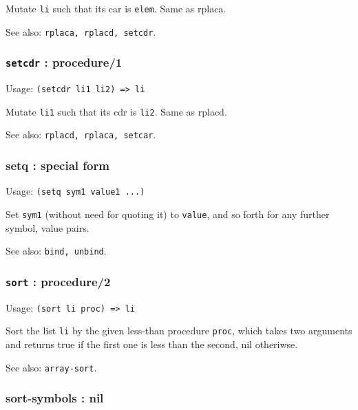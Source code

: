 \documentclass[
]{article}
\newcommand{\passthrough}[1]{#1}
\begin{document}
Mutate \passthrough{\lstinline!li!} such that its car is
\passthrough{\lstinline!elem!}. Same as rplaca.

See also: \passthrough{\lstinline!rplaca, rplacd, setcdr!}.

\hypertarget{setcdr-procedure1}{%
\subsubsection{\texorpdfstring{\texttt{setcdr} :
procedure/1}{setcdr : procedure/1}}\label{setcdr-procedure1}}

Usage: \passthrough{\lstinline!(setcdr li1 li2) => li!}

Mutate \passthrough{\lstinline!li1!} such that its cdr is
\passthrough{\lstinline!li2!}. Same as rplacd.

See also: \passthrough{\lstinline!rplacd, rplaca, setcar!}.

\hypertarget{setq-special-form}{%
\subsubsection{setq : special form}\label{setq-special-form}}

Usage: \passthrough{\lstinline!(setq sym1 value1 ...)!}

Set \passthrough{\lstinline!sym1!} (without need for quoting it) to
\passthrough{\lstinline!value!}, and so forth for any further symbol,
value pairs.

See also: \passthrough{\lstinline!bind, unbind!}.

\hypertarget{sort-procedure2}{%
\subsubsection{\texorpdfstring{\texttt{sort} :
procedure/2}{sort : procedure/2}}\label{sort-procedure2}}

Usage: \passthrough{\lstinline!(sort li proc) => li!}

Sort the list \passthrough{\lstinline!li!} by the given less-than
procedure \passthrough{\lstinline!proc!}, which takes two arguments and
returns true if the first one is less than the second, nil otheriwse.

See also: \passthrough{\lstinline!array-sort!}.

\hypertarget{sort-symbols-nil}{%
\subsubsection{sort-symbols : nil}\label{sort-symbols-nil}}
\end{document}
